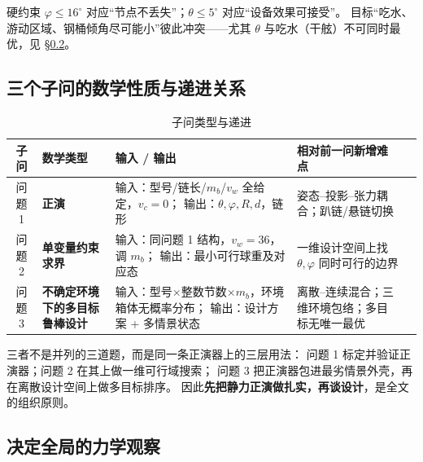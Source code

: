 \documentclass[UTF8,a4paper,zihao=-4]{ctexart}
\begin{document}
硬约束 \(\varphi\le16^\circ\) 对应“节点不丢失”；\(\theta\le5^\circ\) 对应“设备效果可接受”。
目标“吃水、游动区域、钢桶倾角尽可能小”彼此冲突——尤其 \(\theta\) 与吃水（干舷）不可同时最优，见 \S\ref{sec:insight}。

\subsection{三个子问的数学性质与递进关系}

\begin{table}[H]
\centering
\caption{子问类型与递进}
\footnotesize
\begin{tabularx}{\textwidth}{c>{\raggedright\arraybackslash}p{2.4cm}X>{\raggedright\arraybackslash}p{2.6cm}>{\raggedright\arraybackslash}p{3.0cm}}
\toprule
子问 & 数学类型 & 输入 / 输出 & 相对前一问新增难点 \\
\midrule
问题 1 & \textbf{正演} &
输入：型号/链长/\(m_b\)/\(v_w\) 全给定，\(v_c=0\)；
输出：\(\theta,\varphi,R,d\)，链形 &
姿态--投影--张力耦合；趴链/悬链切换 \\
问题 2 & \textbf{单变量约束求界} &
输入：同问题 1 结构，\(v_w=36\)，调 \(m_b\)；
输出：最小可行球重及对应态 &
一维设计空间上找 \(\theta,\varphi\) 同时可行的边界 \\
问题 3 & \textbf{不确定环境下的多目标鲁棒设计} &
输入：型号\(\times\)整数节数\(\times m_b\)，环境箱体无概率分布；
输出：设计方案 + 多情景状态 &
离散--连续混合；三维环境包络；多目标无唯一最优 \\
\bottomrule
\end{tabularx}
\end{table}

三者不是并列的三道题，而是同一条正演器上的三层用法：
问题 1 标定并验证正演器；问题 2 在其上做一维可行域搜索；
问题 3 把正演器包进最劣情景外壳，再在离散设计空间上做多目标排序。
因此\textbf{先把静力正演做扎实，再谈设计}，是全文的组织原则。

\subsection{决定全局的力学观察}\label{sec:insight}
\end{document}
